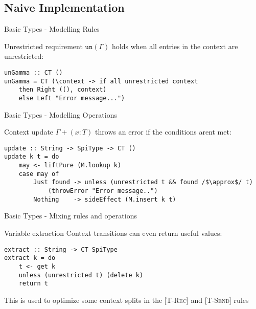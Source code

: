 \subsection{Naive Implementation}

\begin{frame}[fragile]{Basic Types - Modelling Rules}

    \begin{exampleblock}{Unrestricted requirement}
        $\texttt{un}(\Gamma)$ holds when all entries in the context are unrestricted:
\vspace{0.5cm}
        \begin{verbatim}
unGamma :: CT ()
unGamma = CT (\context -> if all unrestricted context
    then Right ((), context)
    else Left "Error message...")  
        \end{verbatim}
    \end{exampleblock}
\end{frame}

\begin{frame}[fragile]{Basic Types - Modelling Operations}

    \begin{exampleblock}{Context update}
        $\Gamma + (x : T)$ throws an error if the conditions arent met:
        \small\begin{verbatim}
update :: String -> SpiType -> CT ()
update k t = do
    may <- liftPure (M.lookup k)
    case may of
        Just found -> unless (unrestricted t && found /$\approx$/ t) 
            (throwError "Error message..")
        Nothing    -> sideEffect (M.insert k t)
        \end{verbatim}
    \end{exampleblock}
    
\end{frame}


\begin{frame}[fragile]{Basic Types - Mixing rules and operations}

    \begin{exampleblock}{Variable extraction}
        Context transitions can even return useful values:
        \small\begin{verbatim}
extract :: String -> CT SpiType
extract k = do
    t <- get k
    unless (unrestricted t) (delete k)
    return t
        \end{verbatim}
    \end{exampleblock}

    This is used to optimize some context splits in the [\textsc{T-Rec}] and [\textsc{T-Send}] rules

\end{frame}

